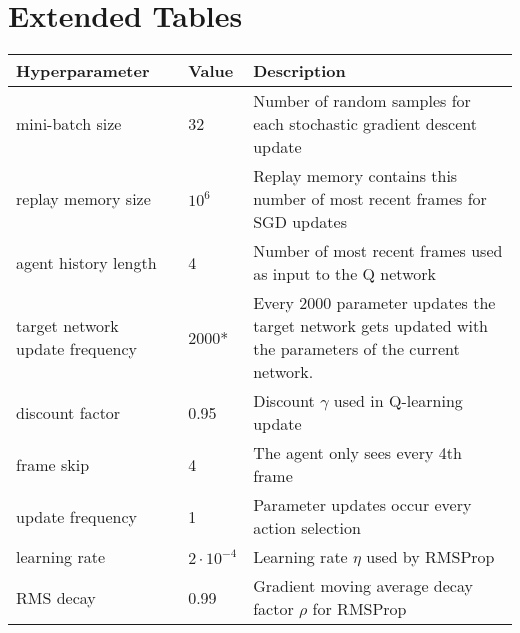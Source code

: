 \chapter{Extended Tables}
\label{app:a}

\begin{table}[]
  \vspace{-2cm}
\label{tab:base}
  \renewcommand{\arraystretch}{1.15}
\small
\begin{tabularx}{1.1\linewidth}{ll X}
Hyperparameter                  & Value             & Description                                                                                              \\
  \hline
mini-batch size                 & 32                & Number of random samples for each stochastic gradient descent update                                     \\
replay memory size              & $10^6$            & Replay memory contains this number of most recent frames for SGD updates                                 \\
agent history length            & 4                 & Number of most recent frames used as input to the Q network                                              \\
target network update frequency & 2000*             & Every 2000 parameter updates the target network gets updated with the parameters of the current network. \\
discount factor                 & 0.95              & Discount $\gamma$ used in Q-learning update                                                              \\
frame skip                      & 4                 & The agent only sees every 4th frame                                                                      \\
update frequency                & 1                 & Parameter updates occur every action selection                                                           \\
learning rate                   & $2 \cdot 10^{-4}$ & Learning rate $\eta$ used by RMSProp                                                                     \\
RMS decay                       & 0.99              & Gradient moving average decay factor $\rho$ for RMSProp                                                  \\

\end{tabularx}
\end{table}
